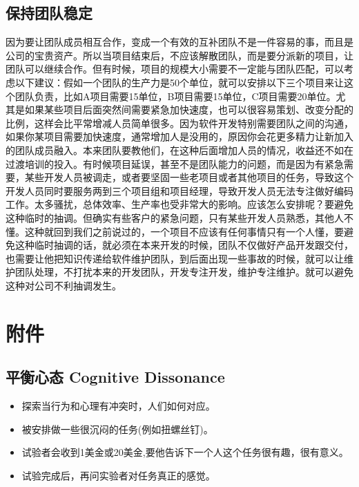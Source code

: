 \hypertarget{ux4fddux6301ux56e2ux961fux7a33ux5b9a}{%
\subsection{保持团队稳定}\label{ux4fddux6301ux56e2ux961fux7a33ux5b9a}}

因为要让团队成员相互合作，变成一个有效的互补团队不是一件容易的事，而且是公司的宝贵资产。所以当项目结束后，不应该解散团队，而是要分派新的项目，让团队可以继续合作。但有时候，项目的规模大小需要不一定能与团队匹配，可以考虑以下建议：假如一个团队的生产力是50个单位，就可以安排以下三个项目来让这个团队负责，比如A项目需要15单位，B项目需要15单位，C项目需要20单位。尤其是如果某些项目后面突然间需要紧急加快速度，也可以很容易策划、改变分配的比例，这样会比平常增减人员简单很多。因为软件开发特别需要团队之间的沟通，如果你某项目需要加快速度，通常增加人是没用的，原因你会花更多精力让新加入的团队成员融入。本来团队要教他们，在这种后面增加人员的情况，收益还不如在过渡培训的投入。有时候项目延误，甚至不是团队能力的问题，而是因为有紧急需要，某些开发人员被调走，或者要坚固一些老项目或者其他项目的任务，导致这个开发人员同时要服务两到三个项目组和项目经理，导致开发人员无法专注做好编码工作。太多骚扰，总体效率、生产率也受非常大的影响。应该怎么安排呢？要避免这种临时的抽调。但确实有些客户的紧急问题，只有某些开发人员熟悉，其他人不懂。这种就回到我们之前说过的，一个项目不应该有任何事情只有一个人懂，要避免这种临时抽调的话，就必须在本来开发的时候，团队不仅做好产品开发跟交付，也需要让他把知识传递给软件维护团队，到后面出现一些事故的时候，就可以让维护团队处理，不打扰本来的开发团队，开发专注开发，维护专注维护。就可以避免这种对公司不利抽调发生。

\hypertarget{ux9644ux4ef6}{%
\section{附件}\label{ux9644ux4ef6}}

\hypertarget{ux5e73ux8861ux5fc3ux6001-cognitive-dissonance}{%
\subsection{平衡心态 Cognitive
Dissonance}\label{ux5e73ux8861ux5fc3ux6001-cognitive-dissonance}}

\begin{itemize}
\tightlist
\item
  探索当行为和心理有冲突时，人们如何对应。
\item
  被安排做一些很沉闷的任务(例如扭螺丝钉)。
\item
  试验者会收到1美金或20美金,要他告诉下一个人这个任务很有趣，很有意义。
\item
  试验完成后，再问实验者对任务真正的感觉。
\end{itemize}

